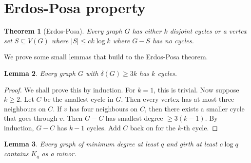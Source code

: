 \documentclass[]{article}
\newtheorem{theorem}{Theorem}
\newtheorem{lemma}[theorem]{Lemma}
\theoremstyle{definition}
\numberwithin{theorem}{section}
\numberwithin{equation}{section}
\begin{document}
\section{Erdos-Posa property}
\begin{theorem}[Erdos-Posa]
	Every graph $G$ has either $k$ disjoint cycles or a vertex set $S \subseteq V(G)$ where $|S| \leq c k \log k$ where $G - S$ has no cycles. 
\end{theorem}

We prove some small lemmas that build to the Erdos-Posa theorem.
\begin{lemma}
	Every graph $G$ with $\delta(G) \geq 3k$ has $k$ cycles.
\end{lemma}
\begin{proof}
	We shall prove this by induction. For $k = 1$, this is trivial. Now suppose $k \geq 2$. Let $C$ be the smallest cycle in $G$. Then every vertex has at most three neighbours on $C$. If $v$ has four neighbours on $C$, then there exists a smaller cycle that goes through $v$. Then $G - C$ has smallest degree $\geq 3(k - 1)$. By induction, $G - C$ has $k - 1$ cycles. Add $C$ back on for the $k$-th cycle. 
\end{proof}

\begin{lemma}
	Every graph of minimum degree at least $q$ and girth at least $c \log q$ contains $K_q$ as a minor. 
\end{lemma}
\end{document}
